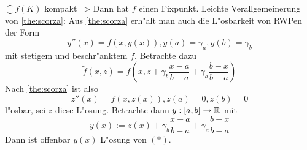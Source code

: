   $\closure{f(K)}$ kompakt=>{
  Dann hat $f$ einen Fixpunkt.
  }
\remark Leichte Verallgemeinerung von \ref{the:scorza}:{
  Aus \ref{the:scorza} erh"alt man auch die L"osbarkeit von RWPen der Form
  \begin{equation}
    \tag{*}y''(x)=f(x,y(x)),y(a)=\gamma_a,y(b)=\gamma_b
    \end{equation}
  mit stetigem und beschr"anktem $f$. Betrachte dazu 
  \[\tilde f(x,z)=f(x,z+\gamma_b\frac{x-a}{b-a}+\gamma_a\frac{b-x}{b-a})
    \]
  Nach \ref{the:scorza} ist also 
  \[z''(x)=f(x,z(x)),z(a)=0,z(b)=0
    \]
  l"osbar, sei $z$ diese L"osung. Betrachte dann $y:[a,b]\to\mathbb R$ mit
  \[y(x):=z(x)+\gamma_b\frac{x-a}{b-a}+\gamma_a\frac{b-x}{b-a}
    \]
  Dann ist offenbar $y(x)$ L"osung von $(*)$.
  }
